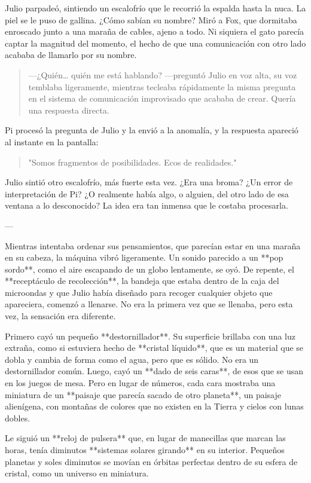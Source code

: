 \documentclass[a4paper,12pt]{book}
\begin{document}
Julio parpadeó, sintiendo un escalofrío que le recorrió la espalda hasta la nuca. La piel se le puso de gallina. ¿Cómo sabían su nombre? Miró a Fox, que dormitaba enroscado junto a una maraña de cables, ajeno a todo. Ni siquiera el gato parecía captar la magnitud del momento, el hecho de que una comunicación con otro lado acababa de llamarlo por su nombre.

\begin{quote}
    —¿Quién… quién me está hablando? —preguntó Julio en voz alta, su voz temblaba ligeramente, mientras tecleaba rápidamente la misma pregunta en el sistema de comunicación improvisado que acababa de crear. Quería una respuesta directa.
\end{quote}

Pi procesó la pregunta de Julio y la envió a la anomalía, y la respuesta apareció al instante en la pantalla:

\begin{quote}
    "Somos fragmentos de posibilidades. Ecos de realidades."
\end{quote}

Julio sintió otro escalofrío, más fuerte esta vez. ¿Era una broma? ¿Un error de interpretación de Pi? ¿O realmente había algo, o alguien, del otro lado de esa ventana a lo desconocido? La idea era tan inmensa que le costaba procesarla.

---

Mientras intentaba ordenar sus pensamientos, que parecían estar en una maraña en su cabeza, la máquina vibró ligeramente. Un sonido parecido a un **pop sordo**, como el aire escapando de un globo lentamente, se oyó. De repente, el **receptáculo de recolección**, la bandeja que estaba dentro de la caja del microondas y que Julio había diseñado para recoger cualquier objeto que apareciera, comenzó a llenarse. No era la primera vez que se llenaba, pero esta vez, la sensación era diferente.

Primero cayó un pequeño **destornillador**. Su superficie brillaba con una luz extraña, como si estuviera hecho de **cristal líquido**, que es un material que se dobla y cambia de forma como el agua, pero que es sólido. No era un destornillador común. Luego, cayó un **dado de seis caras**, de esos que se usan en los juegos de mesa. Pero en lugar de números, cada cara mostraba una miniatura de un **paisaje que parecía sacado de otro planeta**, un paisaje alienígena, con montañas de colores que no existen en la Tierra y cielos con lunas dobles.

Le siguió un **reloj de pulsera** que, en lugar de manecillas que marcan las horas, tenía diminutos **sistemas solares girando** en su interior. Pequeños planetas y soles diminutos se movían en órbitas perfectas dentro de su esfera de cristal, como un universo en miniatura.
\end{document}
